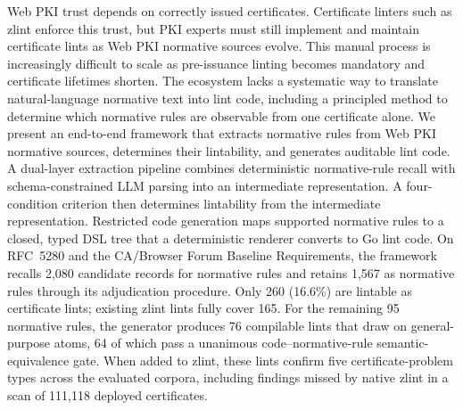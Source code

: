 Web PKI trust depends on correctly issued certificates. Certificate
linters such as zlint enforce this trust, but PKI experts must still implement
and maintain certificate lints as Web PKI normative sources evolve. This manual process
is increasingly difficult to scale as pre-issuance linting becomes mandatory and
certificate lifetimes shorten. The ecosystem lacks a systematic way to translate
natural-language normative text into lint code, including a principled method to
determine which normative rules are observable from one certificate alone. We present an
end-to-end framework that extracts normative rules from Web PKI normative sources,
determines their lintability, and generates auditable lint code. A dual-layer
extraction pipeline combines deterministic normative-rule recall with
schema-constrained LLM parsing into an intermediate
representation. A four-condition criterion then determines lintability from
the intermediate representation. Restricted code
generation maps supported normative rules to a closed, typed DSL tree that a deterministic
renderer converts to Go lint code. On RFC~5280 and the CA/Browser Forum Baseline Requirements, the framework
recalls 2,080 candidate records for normative rules and retains 1,567 as normative rules through its
adjudication procedure. Only
260 (16.6\%) are lintable as certificate lints; existing zlint
lints fully cover 165. For the remaining 95 normative rules, the generator produces 76
compilable lints that draw on general-purpose atoms, 64 of which pass a unanimous
code--normative-rule semantic-equivalence gate.
When added to zlint, these lints confirm five certificate-problem types across
the evaluated corpora, including findings missed by native zlint in a scan of
111,118 deployed certificates.
